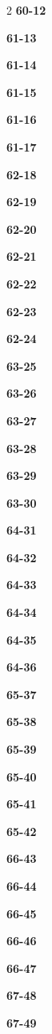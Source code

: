 \documentclass[10pt,a4paper]{article}
\begin{document}
\begin{multicols}{2}
\noindent\textbf{60-12}\ \par
\noindent\textbf{61-13}\ \par
\noindent\textbf{61-14}\ \par
\noindent\textbf{61-15}\ \par
\noindent\textbf{61-16}\ \par
\noindent\textbf{61-17}\ \par
\noindent\textbf{62-18}\ \par
\noindent\textbf{62-19}\ \par
\noindent\textbf{62-20}\ \par
\noindent\textbf{62-21}\ \par
\noindent\textbf{62-22}\ \par
\noindent\textbf{62-23}\ \par
\noindent\textbf{62-24}\ \par
\noindent\textbf{63-25}\ \par
\noindent\textbf{63-26}\ \par
\noindent\textbf{63-27}\ \par
\noindent\textbf{63-28}\ \par
\noindent\textbf{63-29}\ \par
\noindent\textbf{63-30}\ \par
\noindent\textbf{64-31}\ \par
\noindent\textbf{64-32}\ \par
\noindent\textbf{64-33}\ \par
\noindent\textbf{64-34}\ \par
\noindent\textbf{64-35}\ \par
\noindent\textbf{64-36}\ \par
\noindent\textbf{65-37}\ \par
\noindent\textbf{65-38}\ \par
\noindent\textbf{65-39}\ \par
\noindent\textbf{65-40}\ \par
\noindent\textbf{65-41}\ \par
\noindent\textbf{65-42}\ \par
\noindent\textbf{66-43}\ \par
\noindent\textbf{66-44}\ \par
\noindent\textbf{66-45}\ \par
\noindent\textbf{66-46}\ \par
\noindent\textbf{66-47}\ \par
\noindent\textbf{67-48}\ \par
\noindent\textbf{67-49}\ \par

\end{multicols}
\end{document}
